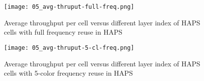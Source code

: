\begin{figure}[!hbp]
\centering
\texttt{[image: 05\_avg-thruput-full-freq.png]}
\caption[Average throughput with full frequency reuse in HAPS]{Average throughput per cell versus different layer index of HAPS cells with full frequency reuse in HAPS} \label{fig:05-avg-thruput-full-freq} 
\end{figure}

\begin{figure}[!hbp]
\centering
\texttt{[image: 05\_avg-thruput-5-cl-freq.png]}
\caption[Average throughput with 5-color frequency reuse in HAPS]{Average throughput per cell versus different layer index of HAPS cells with 5-color frequency reuse in HAPS} \label{fig:05-avg-thruput-5-cl-freq} 
\end{figure}
